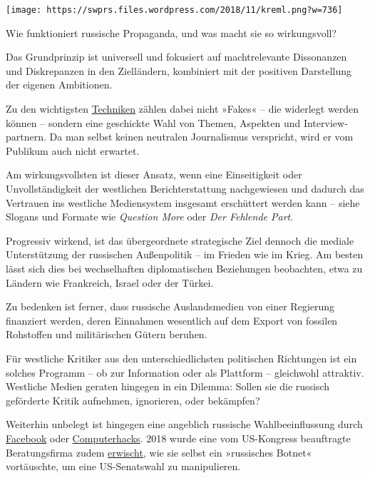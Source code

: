 \texttt{[image: https://swprs.files.wordpress.com/2018/11/kreml.png?w=736]}

Wie funktioniert russische Propaganda, und was macht sie so
wirkungsvoll?

Das Grundprinzip ist universell und fokusiert auf macht­re­le­vante
Dis­so­n­an­zen und Dis­kre­panzen in den Ziel­ländern, kombiniert mit
der positiven Dar­stel­lung der eigenen Ambitionen.

Zu den wichtigsten
\href{https://swprs.org/der-propaganda-schluessel/}{Techniken} zählen
dabei nicht »Fa­kes« -- die widerlegt werden können -- son­dern eine
geschickte Wahl von Themen, As­pek­ten und Inter­view­part­nern. Da man
selbst keinen neutralen Jour­na­lis­mus verspricht, wird er vom Publikum
auch nicht erwartet.

Am wirkungsvollsten ist dieser Ansatz, wenn eine Einseitigkeit oder
Unvollständigkeit der westlichen Berichterstattung nachgewiesen und
dadurch das Vertrauen ins westliche Mediensystem insgesamt erschüttert
werden kann -- siehe Slogans und Formate wie \emph{Question More} oder
\emph{Der Fehlende Part}.

Progressiv wirkend, ist das übergeordnete strategische Ziel dennoch die
mediale Unter­stüt­zung der russischen Außenpolitik -- im Frieden wie im
Krieg. Am besten lässt sich dies bei wechselhaften diplomatischen
Beziehungen beobachten, etwa zu Ländern wie Frankreich, Israel oder der
Türkei.

Zu bedenken ist ferner, dass russische Auslandsmedien von einer
Regierung finanziert werden, deren Einnahmen wesentlich auf dem Export
von fossilen Rohstoffen und militärischen Gütern beruhen.

Für westliche Kritiker aus den unterschiedlichsten politischen
Richtungen ist ein solches Programm -- ob zur Information oder als
Plattform -- gleichwohl at­trak­tiv. Westliche Medien geraten hingegen
in ein Dilemma: Sollen sie die russisch geförderte Kritik aufnehmen,
ignorieren, oder bekämpfen?

Weiterhin unbelegt ist hingegen eine angeblich russische
Wahlbeeinflussung durch
\href{https://www.thenation.com/article/russiagate-elections-interference/}{Facebook}
oder
\href{https://consortiumnews.com/2018/08/13/too-big-to-fail-russia-gate-one-year-after-vips-showed-a-leak-not-a-hack/}{Computerhacks}.
2018 wurde eine vom US-Kongress beauftragte Beratungsfirma zudem
\href{https://thegrayzone.com/2018/12/25/senate-report-on-russian-interference-was-written-by-disinformation-warriors-behind-alabama-false-flag-operation/}{erwischt},
wie sie selbst ein »russisches Botnet« vortäuschte, um eine
US-Senatswahl zu manipulieren.

